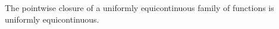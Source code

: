 The pointwise closure of a uniformly equicontinuous family of functions is uniformly equicontinuous.
